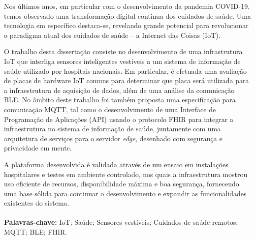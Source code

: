 \vspace{1cm}
\noindent

Nos últimos anos, em particular com o desenvolvimento da pandemia COVID-19, temos observado uma transformação digital continua dos cuidados de saúde. Uma tecnologia em específico destaca-se, revelando grande potencial para revolucionar o paradigma atual dos cuidados de saúde -- a Internet das Coisas (\acs{IoT}).

O trabalho desta dissertação consiste no desenvolvimento de uma infrastrutura \acs{IoT} que interliga sensores inteligentes vestíveis a um sistema de informação de saúde utilizado por hospitais nacionais. Em particular, é efetuada uma avaliação de placas de hardware \acs{IoT} comuns para determinar que placa será utilizada para a infraestrutura de aquisição de dados, além de uma análise da comunicação \acf{BLE}. No âmbito deste trabalho foi também proposta uma especificação para comunicação \acf{MQTT}, tal como o desenvolvimento de uma Interface de Programação de Aplicações (\acs{API}) usando o protocolo \acf{FHIR} para integrar a infraestrutura no sistema de informação de saúde, juntamente com uma arquitetura de serviços para o servidor \textit{edge}, desenhado com segurança e privacidade em mente.

A plataforma desenvolvida é validada através de um ensaio em instalações hospitalares e testes em ambiente controlado, nos quais a infraestrutura mostrou uso eficiente de recursos, disponibilidade máxima e boa segurança, fornecendo uma base sólida para continuar o desenvolvimento e expandir as funcionalidades existentes do sistema.


\paragraph{}\textbf{Palavras-chave:} IoT; Saúde; Sensores vestíveis; Cuidados de saúde remotos; MQTT; BLE; FHIR.